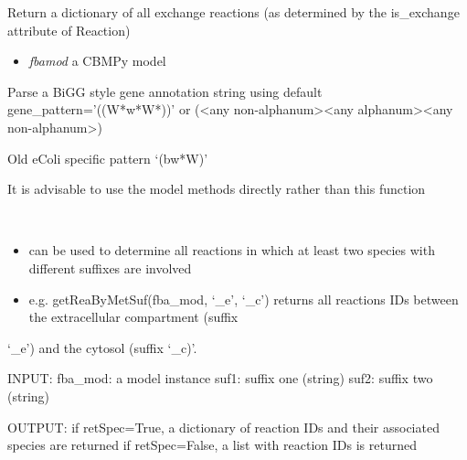 \documentclass[a4paper,11pt,english]{sphinxmanual}
\begin{document}

\begin{fulllineitems}
\label{modules_doc:cbmpy.CBTools.getExchBoundsDict}
Return a dictionary of all exchange reactions (as determined by the is\_exchange attribute of Reaction)
\begin{itemize}
\item {} 
\emph{fbamod} a CBMPy model

\end{itemize}

\end{fulllineitems}


\begin{fulllineitems}
\label{modules_doc:cbmpy.CBTools.getModelGenesPerReaction}
Parse a BiGG style gene annotation string using default gene\_pattern='((W*w*W*))' or
(\textless{}any non-alphanum\textgreater{}\textless{}any alphanum\textgreater{}\textless{}any non-alphanum\textgreater{})

Old eColi specific pattern `(bw*W)'

It is advisable to use the model methods directly rather than this function

\end{fulllineitems}


\begin{fulllineitems}
\label{modules_doc:cbmpy.CBTools.getReaByMetSuf}~\begin{itemize}
\item {} 
can be used to determine all reactions in which at least two species with different suffixes are involved

\item {} 
e.g. getReaByMetSuf(fba\_mod, `\_e', `\_c') returns all reactions IDs between the extracellular compartment (suffix

\end{itemize}

`\_e') and the cytosol (suffix `\_c)'.

INPUT:
fba\_mod: a model instance
suf1: suffix one (string)
suf2: suffix two (string)

OUTPUT:
if retSpec=True, a dictionary of reaction IDs and their associated species are returned
if retSpec=False, a list with reaction IDs is returned

\end{fulllineitems}
\end{document}
